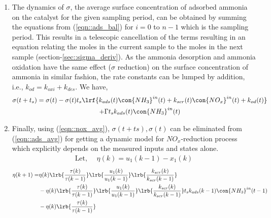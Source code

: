 \begin{enumerate}
        \item The dynamics of $\sigma$, the average surface concentration of adsorbed ammonia on the catalyst for the
                given sampling period, can be obtained by summing the equations from (\ref{eqn::ads_bal}) for $i = 0$ to
                $n-1$ which is the sampling period. This results in a telescopic cancellation of the terms resulting in
                an equation relating the moles in the current sample to the moles in the next sample
                (section-\ref{sec::sigma_deriv}). As the ammonia desorption and ammonia oxidation have the same effect
                ($\sigma$ reduction) on the surface concentration of ammonia in similar fashion, the rate constants can
                be lumped by addition, i.e., $k_{od} = k_{oxi} + k_{des}$. We have,
                \begin{multline}
                        \sigma(t + t_s) = \sigma(t) - \sigma(t) t_s \lrf{k_{ads}(t) \con{NH_3}^{in}(t)
                                                                                + k_{scr}(t) \con{NO_x}^{in}(t)
                                                                                + k_{od}(t)}
                                                \\
                                                + \Gamma t_s k_{ads}(t) \con{NH_3}^{in}(t)
                        \label{eqn::ads_avg}
                \end{multline}
        \item Finally, using (\ref{eqn::nox_avg}), $\sigma(t+ts), \sigma(t)$ can be eliminated from (\ref{eqn::ads_avg}) for getting a dynamic model for $NO_x$-reduction process which explicitly depends on the measured inputs and states alone.
                \begin{align}
                        \text{Let, }\quad \eta(k) = u_1(k-1) - x_1(k)
                \end{align}
\begin{align*}
        \eta(k+1) =& \eta(k) \lrb{\frac{\tau(k)}{\tau(k-1)}}
                                \lrb{\frac{u_1(k)}{u_1(k-1)}}
                                \lrb{\frac{k_{scr}(k)}{k_{scr}(k-1)}} \\
                &-\eta(k) \lrb{\frac{\tau(k)}{\tau(k-1)}}
                                \lrb{\frac{u_1(k)}{u_1(k-1)}}
                                \lrb{\frac{k_{scr}(k)}{k_{scr}(k-1)}}
                t_s k_{ads}(k-1) \con{NH_3}^{in}(t-1)
                \\
                &-\eta(k) \lrb{\frac{\tau(k)}{\tau(k-1)}}

\end{align*}
\end{enumerate}
